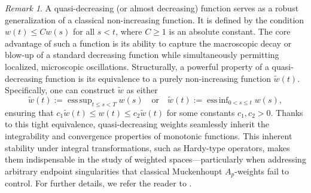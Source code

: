\documentclass[11pt,reqno]{amsart}
\theoremstyle{definition}
\theoremstyle{remark}
\newtheorem{rem}[thm]{Remark}
\DeclareMathOperator*{\esssup}{ess\,sup}
\DeclareMathOperator*{\essinf}{ess\,inf}
\numberwithin{equation}{section}
\begin{document}
\begin{rem}
A quasi-decreasing (or almost decreasing) function serves as a robust generalization of a classical non-increasing function. It is defined by the condition $w(t) \le C w(s)$ for all $s < t$, where $C \ge 1$ is an absolute constant. 
The core advantage of such a function is its ability to capture the macroscopic decay or blow-up of a standard decreasing function while simultaneously permitting localized, microscopic oscillations. 
Structurally, a powerful property of a quasi-decreasing function is its equivalence to a purely non-increasing function $\tilde{w}(t)$. Specifically, one can construct $\tilde{w}$ as either
$$
\tilde{w}(t) := \esssup_{t \le s < T} w(s) \quad \text{or} \quad \tilde{w}(t) := \essinf_{0 < s \le t} w(s),
$$
ensuring that $c_1 \tilde{w}(t) \le w(t) \le c_2 \tilde{w}(t)$ for some constants $c_1, c_2 > 0$. Thanks to this tight equivalence, quasi-decreasing weights seamlessly inherit the integrability and convergence properties of monotonic functions. 
This inherent stability under integral transformations, such as Hardy-type operators, makes them indispensable in the study of weighted spaces—particularly when addressing arbitrary endpoint singularities that classical Muckenhoupt $A_p$-weights fail to control. 
For further details, we refer the reader to \cite{KMP1,K1,BGT1,KMS1}.
\end{rem}
\end{document}

